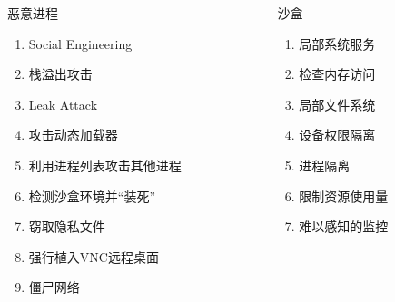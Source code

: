 \documentclass[UTF8,fontset=macnew,xcolor=table]{ctexbeamer}
\begin{document}
\begin{frame}
    \begin{columns}
        \begin{column}{0.3\textwidth}
            {\footnotesize \begin{block}{恶意进程}
                \begin{enumerate}
                    \item Social Engineering
                    \item 栈溢出攻击
                    \item Leak Attack
                    \item 攻击动态加载器
                    \item 利用进程列表攻击其他进程
                    \item 检测沙盒环境并“装死”
                    \item 窃取隐私文件
                    \item 强行植入VNC远程桌面
                    \item 僵尸网络
                \end{enumerate}
            \end{block}}
        \end{column}
    
        \begin{column}{0.3\textwidth}
            {\footnotesize \begin{block}{沙盒}
                \begin{enumerate}
                    \item 局部系统服务
                    \item 检查内存访问
                    \item 局部文件系统
                    \item 设备权限隔离
                    \item 进程隔离
                    \item 限制资源使用量
                    \item 难以感知的监控
                \end{enumerate}
            \end{block}}
        \end{column}


\end{columns}
\end{frame}
\end{document}

